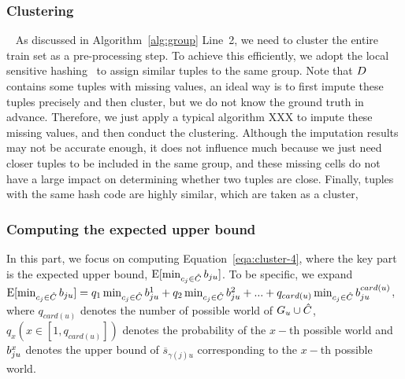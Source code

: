 \subsubsection{Clustering}~\label{subsec:clustering}
As discussed in Algorithm~\ref{alg:group} Line~2, we need to cluster the entire train set as a pre-processing step. To achieve this efficiently, we adopt the local sensitive hashing~\cite{} to assign similar tuples to the same group. 
%
Note that $D$ contains some tuples with missing values, an ideal way is to first impute these tuples precisely and then cluster, but we do not know the ground truth in advance. Therefore, we just apply a typical algorithm \ie XXX to impute these missing values, and then conduct the clustering. Although the imputation results may  not be accurate enough, it does not influence much because we just need closer tuples to be included in the same group, and these missing cells do not have a large impact on determining whether two tuples are close. 
%
Finally, tuples with the same hash code are highly similar, which are taken as a cluster,
%
 



\subsubsection{Computing the expected upper bound} In this part, we focus on computing Equation~\ref{eqa:cluster-4}, where the key part is the expected upper bound, \ie $\mathrm{E}[\min_{c_j\in \hat{C}}b_{ju}]$. To be specific, we expand $\mathrm{E}[\min_{c_j\in \hat{C}}b_{ju}] = q_1\min_{c_j\in \hat{C}}b_{ju}^1 + q_2\min_{c_j\in \hat{C}}b_{ju}^2 + ... +q_{card(u)}\min_{c_j\in \hat{C}}b_{ju}^{card(u)}$, where $q_{card(u)}$ denotes the number of possible world of $G_u \cup \hat{C}$, $q_x    (x\in [1, q_{card(u)}])$ denotes the probability of the $x-$th possible world and  $b_{ju}^x$ denotes the upper bound of $\overline{s}_{\gamma(j)u}$ corresponding to the $x-$th possible world. 

